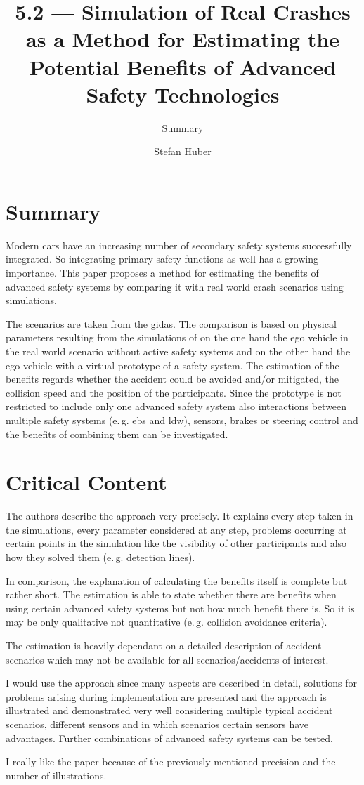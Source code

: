 \documentclass[oneside, notitlepage, twocolumn]{scrartcl}
\title{\LARGE 5.2 --- Simulation of Real Crashes as a Method for Estimating the Potential Benefits of Advanced Safety Technologies}
\subtitle{Summary}
\author{Stefan Huber}
\newcommand{\eg}{e.\,g.\xspace}
\begin{document}
\maketitle

\section{Summary}
Modern cars have an increasing number of secondary safety systems successfully integrated.
So integrating primary safety functions as well has a growing importance.
This paper proposes a method for estimating the benefits of advanced safety systems by comparing it with real world crash scenarios using simulations.\par
The scenarios are taken from the \gls{gidas}.
The comparison is based on physical parameters resulting from the simulations of on the one hand the ego vehicle in the real world scenario without active safety systems and on the other hand the ego vehicle with a virtual prototype of a safety system.
The estimation of the benefits regards whether the accident could be avoided and/or mitigated, the collision speed and the position of the participants.
Since the prototype is not restricted to include only one advanced safety system also interactions between multiple safety systems (\eg{} \gls{ebs} and \gls{ldw}), sensors, brakes or steering control and the benefits of combining them can be investigated.

\section{Critical Content}
The authors describe the approach very precisely.
It explains every step taken in the simulations, every parameter considered at any step, problems occurring at certain points in the simulation like the visibility of other participants and also how they solved them (\eg{} detection lines).\par
In comparison, the explanation of calculating the benefits itself is complete but rather short.
The estimation is able to state whether there are benefits when using certain advanced safety systems but not how much benefit there is.
So it is may be only qualitative not quantitative (\eg{} collision avoidance criteria).\par
The estimation is heavily dependant on a detailed description of accident scenarios which may not be available for all scenarios/accidents of interest.\par
I would use the approach since many aspects are described in detail, solutions for problems arising during implementation are presented and the approach is illustrated and demonstrated very well considering multiple typical accident scenarios, different sensors and in which scenarios certain sensors have advantages.
Further combinations of advanced safety systems can be tested.\par
I really like the paper because of the previously mentioned precision and the number of illustrations.
\end{document}
